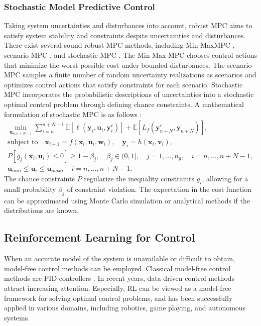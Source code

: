 \subsubsection{Stochastic Model Predictive Control}
Taking system uncertainties and disturbances into account, robust \ac{MPC} \citep{rmpc1987} aims to satisfy system stability and constraints despite uncertainties and disturbances. There exist several sound robust \ac{MPC} methods, including Min-Max\ac{MPC} \citep{RAIMONDO20095}, scenario \ac{MPC} \citep{Calafiore_2013}, and stochastic \ac{MPC} \citep{HEIRUNG2018158,smpc2016}. The Min-Max \ac{MPC} chooses control actions that minimize the worst possible cost under bounded disturbances. The scenario \ac{MPC} samples a finite number of random uncertainty realizations as scenarios and optimizes control actions that satisfy constraints for each scenario. Stochastic \ac{MPC} incorporates the probabilistic descriptions of uncertainties into a stochastic optimal control problem through defining chance constraints. A mathematical formulation of stochastic \ac{MPC} is as follows \citep{HEIRUNG2018158} :
\begin{subequations}
    \label{eq:smpc}
    \begin{gather}
        \min_{\boldsymbol{u}_{n:n+N-1}}\sum_{i=n}^{n+N-1}\mathbb{E}[\ell(\boldsymbol{y}_{i}, \boldsymbol{u}_{i}, \boldsymbol{y}^r_{i})]+\mathbb{E}[L_f(\boldsymbol{y}^r_{n+N},\boldsymbol{y}_{n+N})],\\
        \text{subject to} \quad \boldsymbol{x}_{i+1} = f(\boldsymbol{x}_i, \boldsymbol{u}_i, \boldsymbol{w}_i), \quad \boldsymbol{y}_i = h(\boldsymbol{x}_i, \boldsymbol{v}_i),\\
        P[g_j(\boldsymbol{x}_i, \boldsymbol{u}_i)\leq 0]\geq1-\beta_j, \quad\beta_j\in(0,1],\quad j=1,\ldots,n_g, \quad i=n,\ldots,n+N-1,\\
        \boldsymbol{u}_{min}\leq\boldsymbol{u}_i\leq\boldsymbol{u}_{max}, \quad i=n,\ldots,n+N-1.
    \end{gather}    
\end{subequations}   
The chance constraints $P$ regularize the inequality constraints $g_i$, allowing for a small probability $\beta_j$ of constraint violation. The expectation in the cost function can be approximated using Monte Carlo simulation or analytical methods if the distributions are known.                                                                                                                                                                             
\subsection{Reinforcement Learning for Control}
When an accurate model of the system is unavailable or difficult to obtain, model-free control methods can be employed. Classical model-free control methods are \ac{PID} controllers \citep{Fliess_2013}. In recent years, data-driven control methods attract increasing attention. Especially, \acf{RL} can be viewed as a model-free framework for solving optimal control problems, and has been successfully applied in various domains, including robotics, game playing, and autonomous systems.

